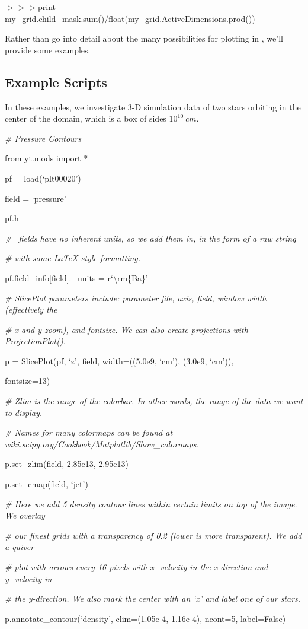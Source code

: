 {\scriptsize$>>>$}print my\_grid.child\_mask.sum()/float(my\_grid.ActiveDimensions.prod())

Rather than go into detail about the many possibilities for plotting
in \yt, we'll provide some examples.

\subsection{Example Scripts}

In these examples, we investigate 3-D simulation data of two stars
orbiting in the center of the domain, which is a box of sides
$10^{10}\:cm$.


{\it\# Pressure Contours}
{\setlength{\parskip}{0pt}

from yt.mods import *
}

pf = load(`plt00020')

field = `pressure'

pf.h

{\it\# \amrex\ fields have no inherent units, so we add them in,
  in the form of a raw string} 

{\setlength{\parskip}{0pt}

{\it\# with some LaTeX-style formatting.}

pf.field\_info[field].\_units = r`\textbackslash rm\{Ba\}'
}


{\it\# SlicePlot parameters include: parameter file, axis, field, window width (effectively the}
{\setlength{\parskip}{0pt}

{\it\# x and y zoom), and fontsize. We can also create projections with ProjectionPlot().}

p = SlicePlot(pf, `z', field, width=((5.0e9, `cm'), (3.0e9, `cm')),

{\setlength{\parindent}{68pt}fontsize=13)}
}

{\it\# Zlim is the range of the colorbar. In other words, the range of the data we want to display.}
{\setlength{\parskip}{0pt}

{\it\# Names for many colormaps can be found at wiki.scipy.org/Cookbook/Matplotlib/Show\_colormaps.}

p.set\_zlim(field, 2.85e13, 2.95e13)
}

p.set\_cmap(field, `jet')

{\it\# Here we add 5 density contour lines within certain limits on top of the image. We overlay}
{\setlength{\parskip}{0pt}

{\it\# our finest grids with a transparency of 0.2 (lower is more transparent). We add a quiver}

{\it\# plot with arrows every 16 pixels with x\_velocity in the x-direction and y\_velocity in}

{\it\# the y-direction. We also mark the center with an `x' and label one of our stars.}

p.annotate\_contour(`density', clim=(1.05e-4, 1.16e-4), ncont=5, label=False)
}

